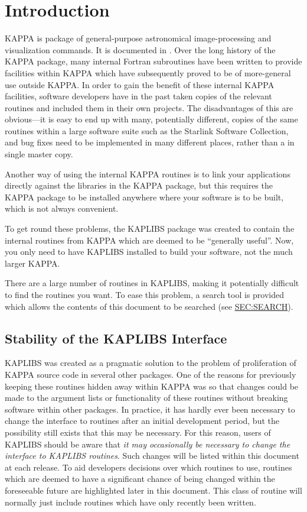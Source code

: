 \documentclass[11pt]{starlink}
\begin{document}
\scfrontmatter

\section {Introduction}

KAPPA is package of general-purpose astronomical image-processing and
visualization commands. It is documented in . Over
the long history of the KAPPA package, many internal Fortran subroutines
have been written to provide facilities within KAPPA which have
subsequently proved to be of more-general use outside KAPPA. In order to
gain the benefit of these internal KAPPA facilities, software developers
have in the past taken copies of the relevant routines and included them
in their own projects. The disadvantages of this are obvious---it is easy
to end up with many, potentially different, copies of the same routines
within a large software suite such as the Starlink Software Collection,
and bug fixes need to be implemented in many different places, rather
than a in single master copy.

Another way of using the internal KAPPA routines is to link your
applications directly against the libraries in the KAPPA package, but
this requires the KAPPA package to be installed anywhere where your
software is to be built, which is not always convenient.

To get round these problems, the KAPLIBS package was created to
contain the internal routines from KAPPA which are deemed to be
``generally useful''. Now, you only need to have KAPLIBS installed to
build your software, not the much larger KAPPA.

There are a large number of routines in KAPLIBS, making it potentially
difficult to find the routines you want. To ease this problem, a search
tool is provided which allows the contents of this document to be
searched (see \hyperref{here}{Section~}{}{SEC:SEARCH}).

\subsection{Stability of the KAPLIBS Interface}
KAPLIBS was created as a pragmatic solution to the problem of
proliferation of KAPPA source code in several other packages. One of the
reasons for previously keeping these routines hidden away within KAPPA was
so that changes could be made to the argument lists or functionality
of these routines without breaking software within other packages. In
practice, it has hardly ever been necessary to change the interface to
routines after an initial development period, but the possibility still
exists that this may be necessary. For this reason, users of KAPLIBS
should be aware that \emph{it may occasionally be necessary to change the
interface to KAPLIBS routines}. Such changes will be listed within
this document at each release. To aid developers decisions over which
routines to use, routines which are deemed to have a significant chance
of being changed within the foreseeable future are highlighted later in
this document. This class of routine will normally just include routines
which have only recently been written.
\end{document}
